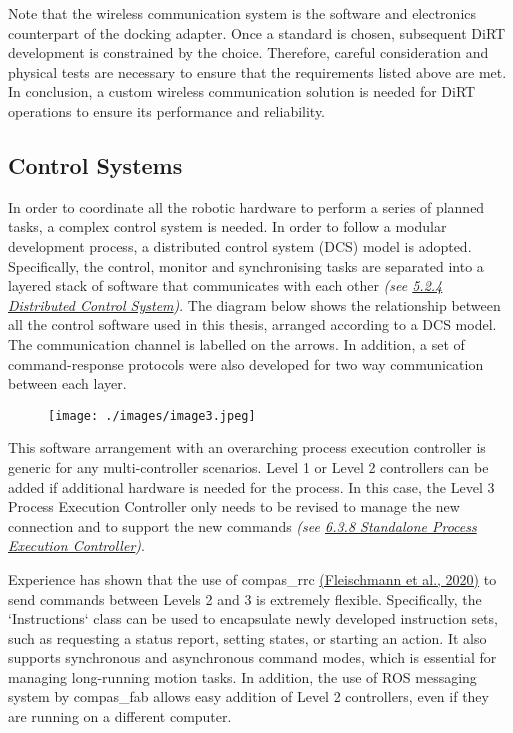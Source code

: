 Note that the wireless communication system is the software and electronics counterpart of the docking adapter. Once a standard is chosen, subsequent DiRT development is constrained by the choice. Therefore, careful consideration and physical tests are necessary to ensure that the requirements listed above are met. In conclusion, a custom wireless communication solution is needed for DiRT operations to ensure its performance and reliability.

\subsection{Control Systems}

In order to coordinate all the robotic hardware to perform a series of planned tasks, a complex control system is needed. In order to follow a modular development process, a distributed control system (DCS) model is adopted. Specifically, the control, monitor and synchronising tasks are separated into a layered stack of software that communicates with each other \textit{(see \uline{5.2.4 Distributed Control System})}. The diagram below shows the relationship between all the control software used in this thesis, arranged according to a DCS model. The communication channel is labelled on the arrows. In addition, a set of command-response protocols were also developed for two way communication between each layer. 

\begin{figure}[H]
\texttt{[image: ./images/image3.jpeg]}
\end{figure}


This software arrangement with an overarching process execution controller is generic for any multi-controller scenarios. Level 1 or Level 2 controllers can be added if additional hardware is needed for the process. In this case, the Level 3 Process Execution Controller only needs to be revised to manage the new connection and to support the new commands \textit{(see \uline{6.3.8 Standalone Process Execution Controller})}. 

Experience has shown that the use of compas\_rrc \href{https://www.zotero.org/google-docs/?svtqbp}{(Fleischmann et al., 2020)} to send commands between Levels 2 and 3 is extremely flexible. Specifically, the `Instructions` class can be used to encapsulate newly developed instruction sets, such as requesting a status report, setting states, or starting an action. It also supports synchronous and asynchronous command modes, which is essential for managing long-running motion tasks. In addition, the use of ROS messaging system by compas\_fab allows easy addition of Level 2 controllers, even if they are running on a different computer. 

